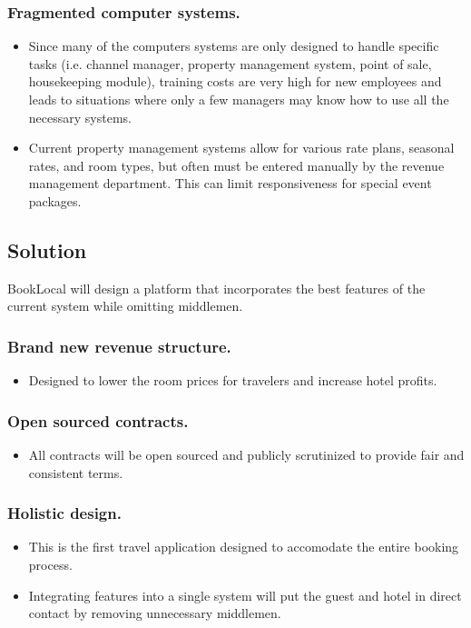 \documentclass{article}
\begin{document}
 \subsubsection*{Fragmented computer systems.}
    	\begin{itemize}
	 \item Since many of the computers systems are only designed to handle specific tasks (i.e. channel manager, property management system, point of sale, housekeeping module), training costs are very high for new employees and leads to situations where only a few managers may know how to use all the necessary systems. 
	 \item Current property management systems allow for various rate plans, seasonal rates, and room types, but often must be entered manually by the revenue management department. This can limit responsiveness for special event packages. 
	\end{itemize}


\subsection{Solution}
BookLocal will design a platform that incorporates the best features of the current system while omitting middlemen.

\subsubsection*{Brand new revenue structure.}
\begin{itemize}
 \item Designed to lower the room prices for travelers and increase hotel profits. 
\end{itemize}

\subsubsection*{Open sourced contracts.}
\begin{itemize}
 \item All contracts will be open sourced and publicly scrutinized to provide fair and consistent terms. 
\end{itemize}

\subsubsection*{Holistic design.}
\begin{itemize}
 \item This is the first travel application designed to accomodate the entire booking process. 
 \item Integrating features into a single system will put the guest and hotel in direct contact by removing unnecessary middlemen.
\end{itemize}
\end{document}
